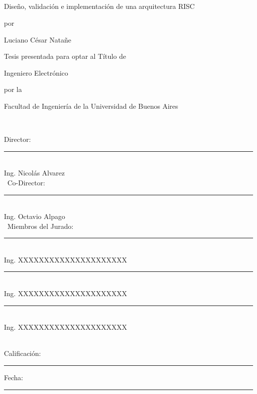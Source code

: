 \enlargethispage{2cm}
\thispagestyle{carat}

\

\

\

\

\begin{center}

\Large{Diseño, validación e implementación de una arquitectura RISC}

\vspace{0.4cm}

\normalsize{por}

\vspace{0.4cm}

\Large{Luciano César Natañe}

\vspace{0.4cm}

\normalsize{Tesis presentada para optar al Título de}

\vspace{0.4cm}

\large{Ingeniero Electrónico}

\vspace{0.4cm}

\normalsize{por la}

\vspace{0.4cm}

\large{Facultad de Ingeniería de la Universidad de Buenos Aires}

\

\end{center}

Director:\\
\hspace*{5.5cm} \rule{7cm}{0.5pt} \\
\hspace*{7cm} Ing. Nicolás Alvarez \\
\
Co-Director:\\
\hspace*{5.5cm} \rule{7cm}{0.5pt} \\
\hspace*{7cm} Ing. Octavio Alpago \\
\
Miembros del Jurado:\\
\hspace*{5.5cm} \rule{7cm}{0.5pt} \\
\hspace*{7cm} Ing. XXXXXXXXXXXXXXXXXXXXX \\

\hspace*{5.5cm} \rule{7cm}{0.5pt} \\
\hspace*{7cm} Ing. XXXXXXXXXXXXXXXXXXXXX \\

\hspace*{5.5cm} \rule{7cm}{0.5pt} \\
\hspace*{7cm} Ing. XXXXXXXXXXXXXXXXXXXXX \\

\

\begin{center}
Calificación: \rule{4cm}{0.5pt} \hspace{1cm} Fecha: \rule{4cm}{0.5pt}\\
\end{center}
